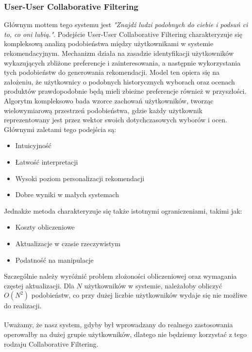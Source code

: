 \documentclass{article}
\begin{document}
\subsubsection{User-User Collaborative Filtering}
Głównym mottem tego systemu jest \textit{"Znajdź ludzi podobnych do ciebie i podsuń ci to, co oni lubią."}. Podejście User-User Collaborative Filtering charakteryzuje się kompleksową analizą podobieństwa między użytkownikami w systemie rekomendacyjnym. Mechanizm działa na zasadzie identyfikacji użytkowników wykazujących zbliżone preferencje i zainteresowania, a następnie wykorzystania tych podobieństw do generowania rekomendacji. Model ten opiera się na założeniu, że użytkownicy o podobnych historycznych wyborach oraz ocenach produktów prawdopodobnie będą mieli zbieżne preferencje również w przyszłości. Algorytm kompleksowo bada wzorce zachowań użytkowników, tworząc wielowymiarową przestrzeń podobieństwa, gdzie każdy użytkownik reprezentowany jest przez wektor swoich dotychczasowych wyborów i ocen. Głównymi zaletami tego podejścia są:
\begin{itemize}
    \item Intuicyjność
    \item Łatwość interpretacji
    \item Wysoki poziom personalizacji rekomendacji
    \item Dobre wyniki w małych systemach
\end{itemize} 
Jednakże metoda charakteryzuje się także istotnymi ograniczeniami, takimi jak:
\begin{itemize}
    \item Koszty obliczeniowe
    \item Aktualizacje w czasie rzeczywistym
    \item Podatność na manipulacje
\end{itemize}
Szczególnie należy wyróżnić problem złożoności obliczeniowej oraz wymagania częstej aktualizacji. Dla $N$ użytkowników w systemie, należałoby obliczyć $O(N^2)$ podobieństw, co przy dużej liczbie użytkowników wydaje się nie możliwe do realizacji.\\\\
Uważamy, że nasz system, gdyby był wprowadzany do realnego zastosowania operowałby na dużej grupie użytkowników, dlatego nie będziemy korzystać z tego rodzaju Collaborative Filtering.
\end{document}
